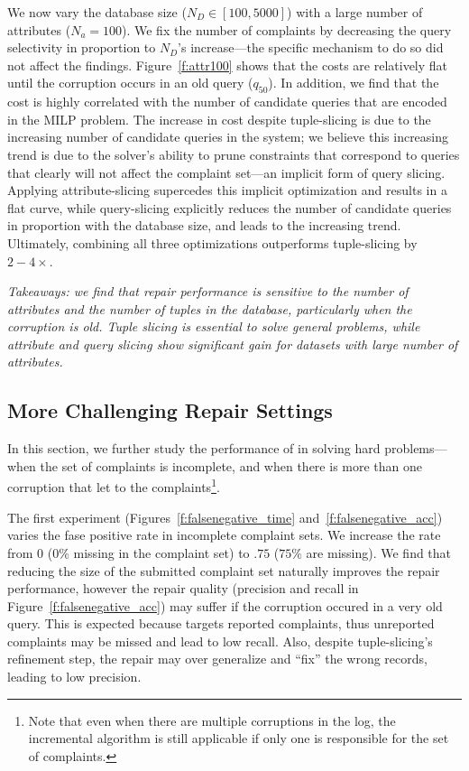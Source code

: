  
We now vary the database size ($N_D \in [100,5000]$) with a large number of attributes ($N_a = 100$).
We fix the number of complaints by decreasing the query selectivity in proportion to $N_D$'s increase---the specific mechanism to do so did not affect the findings.
Figure~\ref{f:attr100} shows that the costs are relatively flat until the corruption occurs in an old query ($q_{50}$).  
In addition, we find that the cost is highly correlated with the number of candidate queries that are encoded in the MILP problem.
The increase in cost despite tuple-slicing is due to the increasing number of candidate queries in the system; 
we believe this increasing trend is due to the solver's ability to prune constraints that correspond to queries that clearly will not affect the complaint set---an implicit form of query slicing.  
Applying attribute-slicing supercedes this implicit optimization and results in a flat curve, 
while query-slicing explicitly reduces the number of candidate queries in proportion with the database size, and leads to the increasing trend.
Ultimately, combining all three optimizations outperforms tuple-slicing by $2-4\times$.

\smallskip
\textit{
  Takeaways: we find that repair performance is sensitive to 
  the number of attributes and the number of tuples in the database, particularly when the corruption is old. 
  Tuple slicing is essential to solve general problems, while attribute and query slicing show significant gain for datasets with large number of attributes.
}



\subsection{More Challenging Repair Settings}
\label{sec:experiments:hardprob}

In this section, we further study the performance of \sys in solving hard problems---when the set of complaints is incomplete, and when there is more than one corruption that let to the complaints\footnote{
\footnotesize Note that even when there are multiple corruptions in the log, the incremental algorithm is still applicable if only one is responsible for the set of complaints.}.
 
 
The first experiment (Figures~\ref{f:falsenegative_time} and~\ref{f:falsenegative_acc}) varies the fase positive rate in incomplete complaint sets.
We increase the rate from $0$ ($0\%$ missing in the complaint set) to $.75$ ($75\%$ are missing).  
We find that reducing the size of the submitted complaint set naturally improves the repair performance,
however the repair quality  (precision and recall in Figure~\ref{f:falsenegative_acc}) may suffer if the corruption occured in a very old query. 
This is expected because \sys targets reported complaints, thus unreported complaints may be missed and lead to low recall.
Also, despite tuple-slicing's refinement step, the repair may over generalize and ``fix'' the wrong records, leading to low precision.


